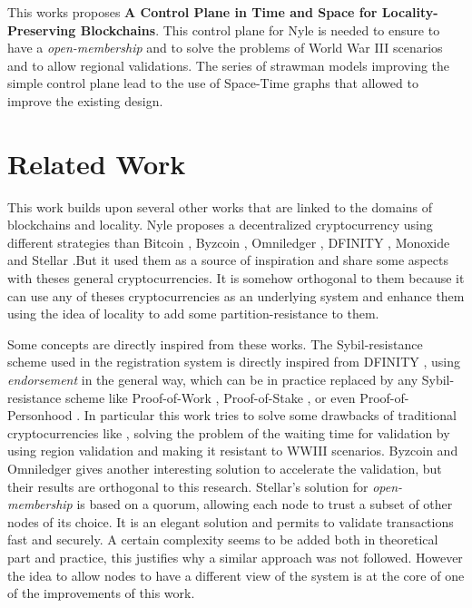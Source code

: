 \documentclass[a4paper,11pt,oneside]{report}
\begin{document}

This works proposes \textbf{A Control Plane in Time and Space for
Locality-Preserving Blockchains}. This control plane for Nyle is needed to
ensure to have a \textit{open-membership} and to solve the problems of World
War III scenarios and to allow regional validations. The series of strawman
models improving the simple control plane lead to the use of Space-Time graphs
that allowed to improve the existing design. 



\chapter{Related Work} \label{chap:RelatedWork}
This work builds upon several other works that are linked to the domains of
blockchains and locality. Nyle proposes a decentralized cryptocurrency using
different strategies than Bitcoin \cite{Nakamoto2009}, Byzcoin \cite{Kogias2016},
Omniledger \cite{Kokoris-Kogias2017}, DFINITY \cite{Hanke2018}, Monoxide
\cite{Wang2019} and Stellar \cite{Lokhava2019}.But it used them as a source of inspiration
and share some aspects with theses general cryptocurrencies.  It is
somehow orthogonal to them because it can use any of theses cryptocurrencies as
an underlying system and enhance them using the idea of locality to add some
partition-resistance to them. 

Some concepts are directly inspired from these works. The Sybil-resistance
scheme used in the registration system is directly inspired from DFINITY
\cite{Hanke2018}, using \textit{endorsement} in the general way, which can be
in practice replaced by any Sybil-resistance scheme like Proof-of-Work
\cite{Nakamoto2009}, Proof-of-Stake \cite{wood2014ethereum}, or even
Proof-of-Personhood \cite{Borge2017}. In particular this work tries to solve
some drawbacks of traditional cryptocurrencies like \cite{Nakamoto2009},
solving the problem of the waiting time for validation by using region
validation and making it resistant to WWIII scenarios. Byzcoin
\cite{Kogias2016} and Omniledger \cite{Kokoris-Kogias2017} gives another
interesting solution to accelerate the validation, but their results are
orthogonal to this research. Stellar's solution for \textit{open-membership}
\cite{Lokhava2019} is based on a quorum, allowing each node to trust a subset
of other nodes of its choice. It is an elegant solution and permits to validate
transactions fast and securely. A certain complexity seems to be added both in
theoretical part and practice, this justifies why  a similar approach was not
followed. However the idea to allow nodes to have a different view of the
system is at the core of one of the improvements of this work.
\end{document}
